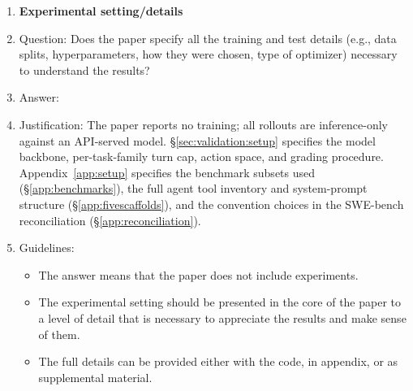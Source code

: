 \begin{enumerate}
\item {\bf Experimental setting/details}
    \item[] Question: Does the paper specify all the training and test details (e.g., data splits, hyperparameters, how they were chosen, type of optimizer) necessary to understand the results?
    \item[] Answer: \answerYes{}
    \item[] Justification: The paper reports no training; all rollouts are inference-only against an API-served model. \S\ref{sec:validation:setup} specifies the model backbone, per-task-family turn cap, action space, and grading procedure. Appendix~\ref{app:setup} specifies the benchmark subsets used (\S\ref{app:benchmarks}), the full agent tool inventory and system-prompt structure (\S\ref{app:fivescaffolds}), and the convention choices in the SWE-bench reconciliation (\S\ref{app:reconciliation}).
    \item[] Guidelines:
    \begin{itemize}
        \item The answer \answerNA{} means that the paper does not include experiments.
        \item The experimental setting should be presented in the core of the paper to a level of detail that is necessary to appreciate the results and make sense of them.
        \item The full details can be provided either with the code, in appendix, or as supplemental material.
    \end{itemize}


\end{enumerate}

